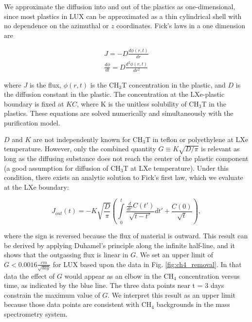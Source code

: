 We approximate the diffusion into and out of the plastics as one-dimensional, since most plastics in LUX can be approximated as a thin cylindrical shell with no dependence on the azimuthal or $z$ coordinates.  Fick's laws in a one dimension are

\begin{align}
J=-D\frac{d \phi(r,t)}{d r}  \\
\frac{d \phi}{d t} = D \frac{d^2 \phi(r,t)}{d r^2} 
\end{align}

\noindent 
where $J$ is the flux, $\phi(r,t)$ is the CH$_3$T  concentration in the plastic, and $D$ is the diffusion constant in the plastic. The concentration at the LXe-plastic boundary is fixed at $KC$, where K is the unitless solubility of CH$_3$T in the plastics. These equations are solved numerically and simultaneously with the purification model. 

$D$ and $K$ are not independently known for CH$_3$T in teflon or polyethylene at LXe temperature. However, only the combined quantity $G \equiv K \sqrt{ D/ \pi }$ is relevant as long as the diffusing substance does not reach the center of the plastic component (a good assumption for diffusion of CH$_3$T at LXe temperature). Under this condition, there exists an analytic solution to Fick's first law, which we evaluate at the LXe boundary:


\begin{equation}
J_{out}(t)= - K \sqrt{\frac{D}{\pi}}\left( \int \limits_0^t \frac{\frac{d}{dt'}C(t')}{\sqrt{t-t'}} dt' + \frac{C(0)}{\sqrt{t}}\right),
\end{equation}

\noindent
where the sign is reversed because the flux of material is outward. This result can be derived by applying Duhamel's principle along the infinite half-line, and it shows that the outgassing flux is linear in $G$. We set an upper limit of $G<0.0016 \frac{cm}{\sqrt{day}}$ for LUX based upon the data in Fig. \ref{fig:ch4_removal}. In that data the effect of $G$ would appear as an elbow in the CH$_4$ concentration versus time, as indicated by the blue line. The three data points near t = 3 days constrain the maximum value of $G$. We interpret this result as an upper limit because those data points are consistent with CH$_4$ backgrounds in the mass spectrometry system.

